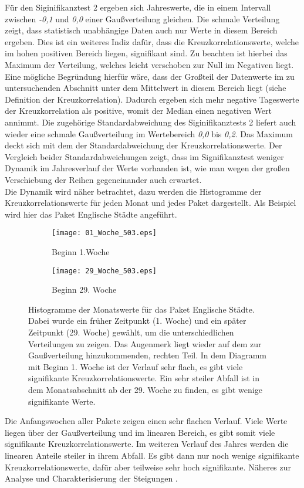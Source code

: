 \documentclass[fontsize=11pt, twoside, a4paper]{scrartcl}
\begin{document}
Für den Siginifikanztest 2 ergeben sich Jahreswerte, die in einem Intervall zwischen \textit{-0,1} und \textit{0,0} einer Gaußverteilung gleichen. Die schmale Verteilung zeigt, dass statistisch unabhängige Daten auch nur Werte in diesem Bereich ergeben. Dies ist ein weiteres Indiz dafür, dass die Kreuzkorrelationswerte, welche im hohen positiven Bereich liegen, signifikant sind. Zu beachten ist hierbei das Maximum der Verteilung, welches leicht verschoben zur Null im Negativen liegt. Eine mögliche Begründung hierfür wäre, dass der Großteil der Datenwerte im zu untersuchenden Abschnitt unter dem Mittelwert in diesem Bereich liegt (siehe Definition der Kreuzkorrelation). Dadurch ergeben sich mehr negative Tageswerte der Kreuzkorrelation als positive, womit der Median einen negativen Wert annimmt. Die zugehörige Standardabweichung des Siginifikanztests 2 liefert auch wieder eine schmale Gaußverteilung im Wertebereich \textit{0,0} bis \textit{0,2}. Das Maximum deckt sich mit dem der Standardabweichung der Kreuzkorrelationswerte. Der Vergleich beider Standardabweichungen zeigt, dass im Signifikanztest weniger Dynamik im Jahresverlauf der Werte vorhanden ist, wie man wegen der großen Verschiebung der Reihen gegeneinander auch erwartet.\\
Die Dynamik wird näher betrachtet, dazu werden die Histogramme der Kreuzkorrelationswerte für jeden Monat und jedes Paket dargestellt. Als Beispiel wird hier das Paket Englische Städte angeführt. 
\begin{figure}[H]
		\begin{minipage}[t]{0.42\textwidth}
		\begin{figure}[H]
		\texttt{[image: 01\_Woche\_503.eps]}
		\caption*{Beginn 1.Woche}
		\end{figure}
	\end{minipage}	
	\begin{minipage}[t]{0.42\textwidth}
		\begin{figure}[H]
		\texttt{[image: 29\_Woche\_503.eps]}
		\caption*{Beginn 29. Woche}
		\end{figure}
	\end{minipage}
\caption{Histogramme der Monatswerte für das Paket Englische Städte. Dabei wurde ein früher Zeitpunkt (1. Woche) und ein später Zeitpunkt (29. Woche) gewählt, um die unterschiedlichen Verteilungen zu zeigen. Das Augenmerk liegt wieder auf dem zur Gaußverteilung hinzukommenden, rechten Teil. In dem Diagramm mit Beginn 1. Woche ist der Verlauf sehr flach, es gibt viele signifikante Kreuzkorrelationswerte. Ein sehr steiler Abfall ist in dem Monatsabschnitt ab der 29. Woche zu finden, es gibt wenige signifikante Werte.}
\end{figure}
\label{sec:St3}
Die Anfangswochen aller Pakete zeigen einen sehr flachen Verlauf. Viele Werte liegen über der Gaußverteilung und im linearen Bereich, es gibt somit viele signifikante Kreuzkorrelationswerte. Im weiteren Verlauf des Jahres werden die linearen Anteile steiler in ihrem Abfall. Es gibt dann nur noch wenige signifikante Kreuzkorrelationswerte, dafür aber teilweise sehr hoch signifikante. Näheres zur Analyse und Charakterisierung der Steigungen .
\end{document}
